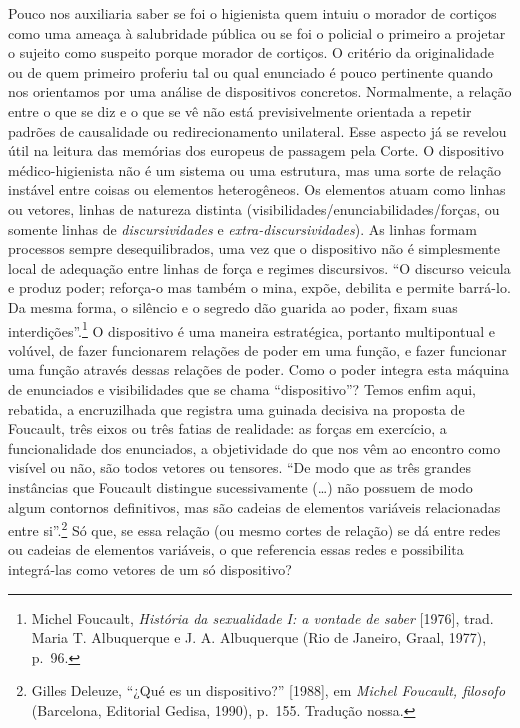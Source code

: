 Pouco nos auxiliaria saber se foi o higienista quem intuiu o morador de
cortiços como uma ameaça à salubridade pública ou se foi o policial o
primeiro a projetar o sujeito como suspeito porque morador de cortiços.
O critério da originalidade ou de quem primeiro proferiu tal ou qual
enunciado é pouco pertinente quando nos orientamos por uma análise de
dispositivos concretos. Normalmente, a relação entre o que se diz e o
que se vê não está previsivelmente orientada a repetir padrões de
causalidade ou redirecionamento unilateral. Esse aspecto já se revelou
útil na leitura das memórias dos europeus de passagem pela Corte. O
dispositivo médico-higienista não é um sistema ou uma estrutura, mas uma
sorte de relação instável entre coisas ou elementos heterogêneos. Os
elementos atuam como linhas ou vetores, linhas de natureza distinta
(visibilidades/enunciabilidades/forças, ou somente linhas de
\emph{discursividades} e \emph{extra-discursividades}). As linhas formam
processos sempre desequilibrados, uma vez que o dispositivo não é
simplesmente local de adequação entre linhas de força e regimes
discursivos. ``O discurso veicula e produz poder; reforça-o mas também o
mina, expõe, debilita e permite barrá-lo. Da mesma forma, o silêncio e o
segredo dão guarida ao poder, fixam suas interdições''.\footnote{Michel
  Foucault, \emph{História da sexualidade I: a vontade de saber}
  {[}1976{]}, trad. Maria T. Albuquerque e J. A. Albuquerque (Rio de
  Janeiro, Graal, 1977), p.~96.} O dispositivo é uma maneira
estratégica, portanto multipontual e volúvel, de fazer funcionarem
relações de poder em uma função, e fazer funcionar uma função através
dessas relações de poder. Como o poder integra esta máquina de
enunciados e visibilidades que se chama ``dispositivo''? Temos enfim
aqui, rebatida, a encruzilhada que registra uma guinada decisiva na
proposta de Foucault, três eixos ou três fatias de realidade: as forças
em exercício, a funcionalidade dos enunciados, a objetividade do que nos
vêm ao encontro como visível ou não, são todos vetores ou tensores. ``De
modo que as três grandes instâncias que Foucault distingue
sucessivamente (\ldots{}) não possuem de modo algum contornos
definitivos, mas são cadeias de elementos variáveis relacionadas entre
si''.\footnote{Gilles Deleuze, ``¿Qué es un dispositivo?'' {[}1988{]},
  em \emph{Michel Foucault, filosofo} (Barcelona, Editorial Gedisa,
  1990), p.~155. Tradução nossa.} Só que, se essa relação (ou mesmo
cortes de relação) se dá entre redes ou cadeias de elementos variáveis,
o que referencia essas redes e possibilita integrá-las como vetores de
um só dispositivo?

